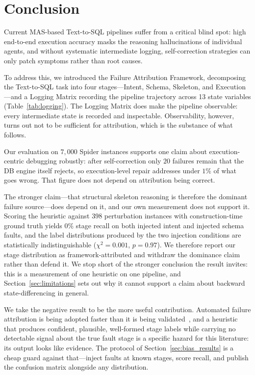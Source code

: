 \documentclass[conference]{IEEEtran}
\begin{document}
\section{Conclusion}
\label{sec:conclusion}
Current MAS-based Text-to-SQL pipelines suffer from a critical blind spot:
high end-to-end execution accuracy masks the reasoning hallucinations of
individual agents, and without systematic intermediate logging,
self-correction strategies can only patch symptoms rather than root causes.

To address this, we introduced the Failure Attribution Framework, decomposing
the Text-to-SQL task into four stages---Intent, Schema, Skeleton, and
Execution---and a Logging Matrix recording the pipeline trajectory across 13
state variables (Table~\ref{tab:logging}). The Logging Matrix does make the
pipeline observable: every intermediate state is recorded and inspectable.
Observability, however, turns out not to be sufficient for attribution, which
is the substance of what follows.

Our evaluation on $7{,}000$ Spider instances supports one claim about
execution-centric debugging robustly: after self-correction only $20$ failures
remain that the DB engine itself rejects, so execution-level repair addresses
under $1\%$ of what goes wrong. That figure does not depend on attribution
being correct.

The stronger claim---that structural skeleton reasoning is therefore the
dominant failure source---does depend on it, and our own measurement does not
support it. Scoring the heuristic against $398$ perturbation instances with
construction-time ground truth yields $0\%$ stage recall on both injected
intent and injected schema faults, and the label distributions produced by the
two injection conditions are statistically indistinguishable
($\chi^2 = 0.001$, $p = 0.97$). We therefore report our stage distribution as
framework-attributed and withdraw the dominance claim rather than defend it.
We stop short of the stronger conclusion the result invites: this is a
measurement of one heuristic on one pipeline, and Section~\ref{sec:limitations}
sets out why it cannot support a claim about backward state-differencing in
general.

We take the negative result to be the more useful contribution. Automated
failure attribution is being adopted faster than it is being
validated~\cite{zhang2025which, cemri_mast_2025}, and a heuristic that produces
confident, plausible, well-formed stage labels while carrying no detectable
signal about the true fault stage is a specific hazard for this literature: its
output looks like evidence. The protocol of Section~\ref{sec:bias_results} is a cheap guard
against that---inject faults at known stages, score recall, and publish the
confusion matrix alongside any distribution.
\end{document}
